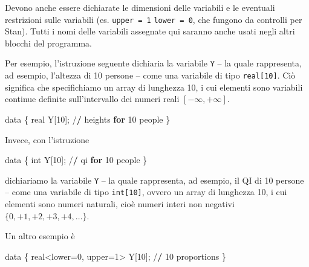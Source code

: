 \documentclass[
  11pt,
]{krantz}
\makeatletter
\newenvironment{Shaded}{\begin{snugshade}}{\end{snugshade}}
\newcommand{\ControlFlowTok}[1]{\textcolor[rgb]{0.27,0.27,0.27}{\textbf{#1}}}
\newcommand{\DecValTok}[1]{\textcolor[rgb]{0.06,0.06,0.06}{#1}}
\newcommand{\ErrorTok}[1]{\textcolor[rgb]{0.14,0.14,0.14}{\textbf{#1}}}
\newcommand{\NormalTok}[1]{#1}
\newcommand{\OtherTok}[1]{\textcolor[rgb]{0.37,0.37,0.37}{#1}}
\newcommand{\SpecialCharTok}[1]{\textcolor[rgb]{0,0,0}{#1}}
\newenvironment{kframe}{%
\medskip{}
\setlength{\fboxsep}{.8em}
 \def\at@end@of@kframe{}%
 \ifinner\ifhmode%
  \def\at@end@of@kframe{\end{minipage}}%
  \begin{minipage}{\columnwidth}%
 \fi\fi%
 \def\FrameCommand##1{\hskip\@totalleftmargin \hskip-\fboxsep
 \colorbox{shadecolor}{##1}\hskip-\fboxsep
     \hskip-\linewidth \hskip-\@totalleftmargin \hskip\columnwidth}%
 \MakeFramed {\advance\hsize-\width
   \@totalleftmargin\z@ \linewidth\hsize
   \@setminipage}}%
 {\par\unskip\endMakeFramed%
 \at@end@of@kframe}
\renewenvironment{Shaded}{\begin{kframe}}{\end{kframe}}
\theoremstyle{definition}
\theoremstyle{definition}
\theoremstyle{definition}
\theoremstyle{definition}
\theoremstyle{remark}
\makeatother
\begin{document}
Devono anche essere dichiarate le dimensioni delle variabili e le eventuali restrizioni sulle variabili (es. \texttt{upper\ =\ 1} \texttt{lower\ =\ 0}, che fungono da controlli per Stan). Tutti i nomi delle variabili assegnate qui saranno anche usati negli altri blocchi del programma.

Per esempio, l'istruzione seguente dichiaria la variabile \texttt{Y} -- la quale rappresenta, ad esempio, l'altezza di 10 persone -- come una variabile di tipo \texttt{real{[}10{]}}. Ciò significa che specifichiamo un array di lunghezza 10, i cui elementi sono variabili continue definite sull'intervallo dei numeri reali \([-\infty, +\infty]\).

\begin{Shaded}
\begin{Highlighting}[]
\NormalTok{data \{}
\NormalTok{  real Y[}\DecValTok{10}\NormalTok{]; }\SpecialCharTok{/}\ErrorTok{/}\NormalTok{ heights }\ControlFlowTok{for} \DecValTok{10}\NormalTok{ people}
\NormalTok{\}}
\end{Highlighting}
\end{Shaded}

Invece, con l'istruzione

\begin{Shaded}
\begin{Highlighting}[]
\NormalTok{data \{}
\NormalTok{  int Y[}\DecValTok{10}\NormalTok{]; }\SpecialCharTok{/}\ErrorTok{/}\NormalTok{ qi }\ControlFlowTok{for} \DecValTok{10}\NormalTok{ people}
\NormalTok{\}}
\end{Highlighting}
\end{Shaded}

dichiariamo la variabile \texttt{Y} -- la quale rappresenta, ad esempio, il QI di 10 persone -- come una variabile di tipo \texttt{int{[}10{]}}, ovvero un array di lunghezza 10, i cui elementi sono numeri naturali, cioè numeri interi non negativi \(\{0, +1, +2, +3, +4, \dots\}\).

Un altro esempio è

\begin{Shaded}
\begin{Highlighting}[]
\NormalTok{data \{}
\NormalTok{  real}\SpecialCharTok{\textless{}}\NormalTok{lower}\OtherTok{=}\DecValTok{0}\NormalTok{, upper}\OtherTok{=}\DecValTok{1}\SpecialCharTok{\textgreater{}}\NormalTok{ Y[}\DecValTok{10}\NormalTok{]; }\SpecialCharTok{/}\ErrorTok{/} \DecValTok{10}\NormalTok{ proportions}
\NormalTok{\}}
\end{Highlighting}
\end{Shaded}
\end{document}
